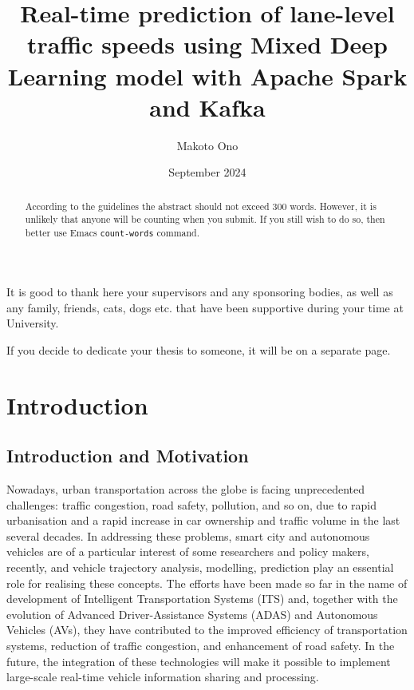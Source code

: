 \documentclass[11pt]{uonthesis}
\title{Real-time prediction of lane-level traffic speeds using Mixed Deep Learning model with Apache Spark and Kafka}
\author{Makoto Ono}
\date{September 2024}
\begin{document}
\begin{frontmatter}
\maketitle
\tableofcontents

\begin{abstract}
According to the guidelines the abstract should not exceed 300 words.
However, it is unlikely that anyone will be counting when you submit.
If you still wish to do so, then better use Emacs \verb|count-words|
command.
\end{abstract}

\begin{acknowledgements}
It is good to thank here your supervisors and any sponsoring bodies,
as well as any family, friends, cats, dogs etc. that have been
supportive during your time at University.
\end{acknowledgements}

\begin{dedication}
If you decide to dedicate your thesis to someone, it will be on a
separate page.
\end{dedication}

\end{frontmatter}

\chapter{Introduction}

\section{Introduction and Motivation}
Nowadays, urban transportation across the globe is facing unprecedented challenges: traffic congestion, road safety, pollution, and so on, due to rapid urbanisation and a rapid increase in car ownership and traffic volume in the last several decades. In addressing these problems, smart city and autonomous vehicles are of a particular interest of some researchers and policy makers, recently, and vehicle trajectory analysis, modelling, prediction play an essential role for realising these concepts. The efforts have been made so far in the name of development of Intelligent Transportation Systems (ITS) and, together with the evolution of Advanced Driver-Assistance Systems (ADAS) and Autonomous Vehicles (AVs), they have contributed to the improved efficiency of transportation systems, reduction of traffic congestion, and enhancement of road safety. In the future, the integration of these technologies will make it possible to implement large-scale real-time vehicle information sharing and processing. 
\end{document}
